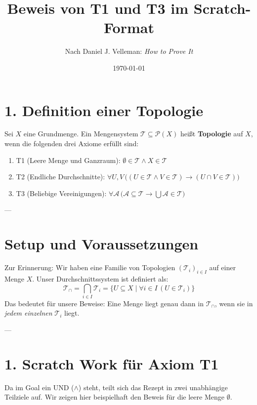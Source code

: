 \documentclass{article}
\title{Beweis von T1 und T3 im Scratch-Format}
\author{Nach Daniel J. Velleman: \emph{How to Prove It}}
\date{\today}
\begin{document}
\maketitle

\section*{1. Definition einer Topologie}

Sei $X$ eine Grundmenge. Ein Mengensystem $\mathcal{T} \subseteq \mathscr{P}(X)$ heißt \textbf{Topologie} auf $X$, wenn die folgenden drei Axiome erfüllt sind:
\begin{enumerate}
    \item T1 (Leere Menge und Ganzraum): $\emptyset \in \mathcal{T} \land X \in \mathcal{T}$
    \item T2 (Endliche Durchschnitte): $\forall U, V \, \big( (U \in \mathcal{T} \land V \in \mathcal{T}) \rightarrow (U \cap V \in \mathcal{T}) \big)$
    \item T3 (Beliebige Vereinigungen): $\forall \mathcal{A} \, \big( \mathcal{A} \subseteq \mathcal{T} \rightarrow \bigcup \mathcal{A} \in \mathcal{T} \big)$
\end{enumerate}

---

\section*{Setup und Voraussetzungen}
Zur Erinnerung: Wir haben eine Familie von Topologien $(\mathcal{T}_i)_{i \in I}$ auf einer Menge $X$. Unser Durchschnittssystem ist definiert als:
\[
\mathcal{T}_{\cap} = \bigcap_{i \in I} \mathcal{T}_i = \{ U \subseteq X \mid \forall i \in I \, (U \in \mathcal{T}_i) \}
\]
Das bedeutet für unsere Beweise: Eine Menge liegt genau dann in $\mathcal{T}_{\cap}$, wenn sie in \emph{jedem einzelnen} $\mathcal{T}_i$ liegt.

---

\newpage

\section*{1. Scratch Work für Axiom T1}

Da im Goal ein UND ($\land$) steht, teilt sich das Rezept in zwei unabhängige Teilziele auf. Wir zeigen hier beispielhaft den Beweis für die leere Menge $\emptyset$.
\end{document}
